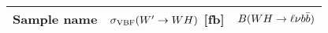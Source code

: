 \scriptsize
\begin{tabular}{lrr}
  \hline
  \textbf{Sample name} & $\sigma_{\mathrm{VBF}}(W'\to WH)$ [fb] & $B(WH\to\ell\nu b\bar{b})$ \\
  \hline
\end{tabular}
